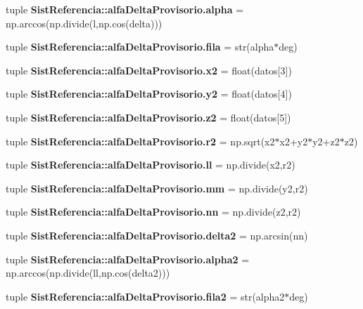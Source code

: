 \begin{DoxyCompactItemize}
\item 
tuple {\bf \-Sist\-Referencia\-::alfa\-Delta\-Provisorio.\-alpha} = np.\-arccos(np.\-divide(l,np.\-cos(delta)))
\item 
tuple {\bf \-Sist\-Referencia\-::alfa\-Delta\-Provisorio.\-fila} = str(alpha$\ast$deg)
\item 
tuple {\bf \-Sist\-Referencia\-::alfa\-Delta\-Provisorio.\-x2} = float(datos[3])
\item 
tuple {\bf \-Sist\-Referencia\-::alfa\-Delta\-Provisorio.\-y2} = float(datos[4])
\item 
tuple {\bf \-Sist\-Referencia\-::alfa\-Delta\-Provisorio.\-z2} = float(datos[5])
\item 
tuple {\bf \-Sist\-Referencia\-::alfa\-Delta\-Provisorio.\-r2} = np.\-sqrt(x2$\ast$x2+y2$\ast$y2+z2$\ast$z2)
\item 
tuple {\bf \-Sist\-Referencia\-::alfa\-Delta\-Provisorio.\-ll} = np.\-divide(x2,r2)
\item 
tuple {\bf \-Sist\-Referencia\-::alfa\-Delta\-Provisorio.\-mm} = np.\-divide(y2,r2)
\item 
tuple {\bf \-Sist\-Referencia\-::alfa\-Delta\-Provisorio.\-nn} = np.\-divide(z2,r2)
\item 
tuple {\bf \-Sist\-Referencia\-::alfa\-Delta\-Provisorio.\-delta2} = np.\-arcsin(nn)
\item 
tuple {\bf \-Sist\-Referencia\-::alfa\-Delta\-Provisorio.\-alpha2} = np.\-arccos(np.\-divide(ll,np.\-cos(delta2)))
\item 
tuple {\bf \-Sist\-Referencia\-::alfa\-Delta\-Provisorio.\-fila2} = str(alpha2$\ast$deg)
\end{DoxyCompactItemize}
